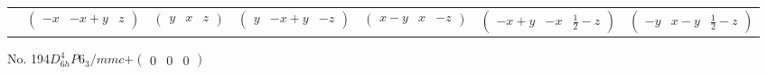\documentclass[fleqn,9pt,landscape]{jsarticle}
\begin{document}
\begin{center}
\begin{longtable}{ccccccc}
& $ \begin{pmatrix} - x & - x + y & z \end{pmatrix} $ & $ \begin{pmatrix} y & x & z \end{pmatrix} $ & $ \begin{pmatrix} y & - x + y & - z \end{pmatrix} $ & $ \begin{pmatrix} x - y & x & - z \end{pmatrix} $ & $ \begin{pmatrix} - x + y & - x & \frac{1}{2} - z \end{pmatrix} $ & $ \begin{pmatrix} - y & x - y & \frac{1}{2} - z \end{pmatrix} $ \\
\end{longtable}
\end{center}
\newpage
No. 194\quad$D_{6h}^{4}$\quad$P6_3/mmc$\quad[ hexagonal ]\quad$+\begin{pmatrix} 0 & 0 & 0 \end{pmatrix}$
\end{document}
